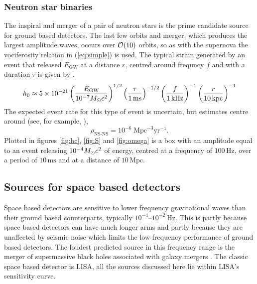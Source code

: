 \subsubsection{Neutron star binaries}
The inspiral and merger of a pair of neutron stars is the prime candidate source for ground based detectors. The last few orbits and merger, which produces the largest amplitude waves, occurs over ${\cal{O}}(10)$ orbits, so as with the supernova the vociferosity relation in (\ref{eq:simple}) is used. The typical strain generated by an event that released $E_{\textrm{GW}}$ at a distance $r$, centred around frequncy $f$ and with a duration $\tau$ is given by \cite{2013ASPC..467...59S}.
\begin{equation} h_{0}\approx 5\times 10^{-21}\left(\frac{E_{\textrm{GW}}}{10^{-7}M_{ \odot } c^{2}}\right)^{1/2}\left( \frac{\tau}{1\,\textrm{ms}} \right)^{-1/2}\left( \frac{f}{1\,\textrm{kHz}} \right)^{-1}\left( \frac{r}{10\,\textrm{kpc}} \right)^{-1} \end{equation}
The expected event rate for this type of event is uncertain, but estimates centre around (see, for example, \cite{2011PrPNP..66..239A}),
\begin{equation} \rho_{\textrm{NS-NS}}=10^{-6}\;\textrm{Mpc}^{-3}\textrm{yr}^{-1}.\end{equation}
Plotted in figures \ref{fig:hc}, \ref{fig:S} and \ref{fig:omega} is a box with an amplitude equal to an event releasing $10^{-4}M_{ \odot } c^{2}$ of energy, centred at a frequency of $100\,\textrm{Hz}$, over a period of $10\,\textrm{ms}$ and at a distance of $10\,\textrm{Mpc}$.

\subsection{Sources for space based detectors}
Space based detectors are sensitive to lower frequency gravitational waves than their ground based counterparts, typically $10^{-4}$--$10^{-2}~\textrm{Hz}$. This is partly because space based detectors can have much longer arms and partly because they are unaffected by seismic noise which limits the low frequency performance of ground based detectors. The loudest predicted source in this frequency range is the merger of supermassive black holes associated with galaxy mergers \cite{JohnsLivingReview}. The classic space based detector is LISA, all the sources discussed here lie within LISA's sensitivity curve.


